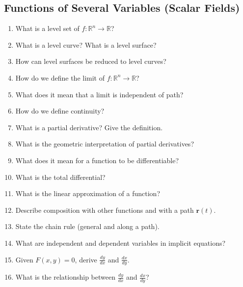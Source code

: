 \subsection{Functions of Several Variables (Scalar Fields)}

\begin{enumerate}

\item What is a level set of $f:\mathbb{R}^n \to \mathbb{R}$?

\item What is a level curve? What is a level surface?

\item How can level surfaces be reduced to level curves?

\item How do we define the limit of $f:\mathbb{R}^n \to \mathbb{R}$?

\item What does it mean that a limit is independent of path?

\item How do we define continuity?

\item What is a partial derivative? Give the definition.

\item What is the geometric interpretation of partial derivatives?

\item What does it mean for a function to be differentiable?

\item What is the total differential?

\item What is the linear approximation of a function?

\item Describe composition with other functions and with a path $\mathbf{r}(t)$.

\item State the chain rule (general and along a path).

\item What are independent and dependent variables in implicit equations?

\item Given $F(x,y)=0$, derive $\frac{dy}{dx}$ and $\frac{dx}{dy}$.

\item What is the relationship between $\frac{dy}{dx}$ and $\frac{dx}{dy}$?

\end{enumerate}

